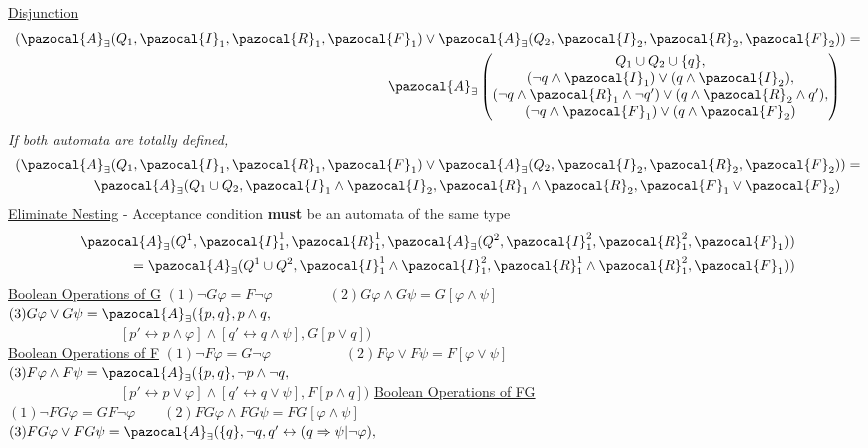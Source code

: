 \documentclass{article}
\newcommand{\Ib}{\pazocal{I}}
\newcommand{\Rb}{\pazocal{R}}
\newcommand{\Ab}{\pazocal{A}}
\newcommand{\Fb}{\pazocal{F}}
\begin{document}
\begin{multicols}{4}
\underline{Disjunction}
\begin{align*}
(\Ab_{\exists}(Q_1,\Ib_1,\Rb_1,\Fb_1)\vee \Ab_{\exists}(Q_2,\Ib_2,\Rb_2,\Fb_2)&)=\\
\Ab_{\exists} \begin{pmatrix}
Q_1 \cup Q_2 \cup \{q\},\\
(\neg q \wedge \Ib_1) \vee (q \wedge \Ib_2), \\
(\neg q \wedge \Rb_1 \wedge \neg q') \vee ( q \wedge \Rb_2 \wedge q'), \\
(\neg q \wedge \Fb_1) \vee (q \wedge \Fb_2)
  \end{pmatrix}
\end{align*}
\textit{If both automata are totally defined,}
\begin{align*}
(\Ab_{\exists}(Q_1,\Ib_1,\Rb_1,\Fb_1)\vee \Ab_{\exists}(Q_2,\Ib_2,\Rb_2,\Fb_2)&)=\\
\Ab_{\exists}(Q_1 \cup Q_2,\Ib_1 \wedge \Ib_2,\Rb_1 \wedge \Rb_2,\Fb_1 \vee \Fb_2)
\end{align*}
\underline{Eliminate Nesting} - Acceptance condition \textbf{must} be an automata of the same type
\begin{align*}
\Ab_{\exists}(Q^1,\Ib_1^1,\Rb_1^1,\Ab_{\exists}(Q^2,\Ib_1^2,\Rb_1^2,\Fb_1))\\
= \Ab_{\exists}(Q^1 \cup Q^2,\Ib_1^1 \wedge \Ib_1^2,\Rb_1^1 \wedge \Rb_1^2,\Fb_1))
\end{align*}
\underline{Boolean Operations of G}
$(1)\neg G \varphi = F \neg \varphi\qquad \qquad  (2)G \varphi \wedge G \psi = G[\varphi \wedge \psi]$\\
$(3) G \varphi \vee G \psi = \Ab_{\exists}(\{p,q\},p \wedge q,\qquad\qquad$\\
$\qquad\qquad\qquad\qquad[p' \leftrightarrow p \wedge \varphi] \wedge [q' \leftrightarrow q \wedge \psi],G[p \vee q])$\\
\vfill
\columnbreak
\underline{Boolean Operations of F}
$(1)\neg F \varphi = G \neg \varphi\qquad \qquad\quad\;(2)F \varphi \vee F \psi = F[\varphi \vee \psi]$\\
$(3) F \varphi \wedge F \psi = \Ab_{\exists}(\{p,q\}, \neg p \wedge \neg q,\qquad\qquad$\\
$\qquad\qquad\qquad\qquad[p' \leftrightarrow p \vee \varphi] \wedge [q' \leftrightarrow q \vee \psi],F[p \wedge q])$
\underline{Boolean Operations of FG}
$(1)\neg FG \varphi = GF \neg \varphi\qquad(2)FG \varphi \wedge FG \psi = FG[\varphi \wedge \psi]$ \\
$(3) FG \varphi \vee FG \psi = \Ab_{\exists}(\{q\}, \neg q, q' \leftrightarrow (q \Rightarrow \psi | \neg \varphi),$\\

\end{multicols}
\end{document}
